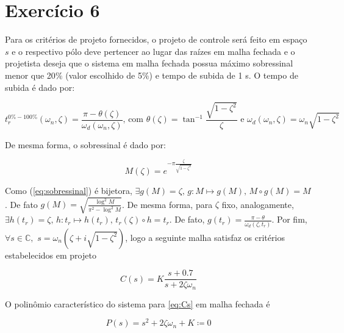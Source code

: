 \section*{Exercício 6}
\label{ex:6}

    Para os critérios de projeto fornecidos, o projeto de controle será feito em espaço $s$ e o respectivo pólo deve pertencer ao lugar das raízes em malha fechada e o projetista deseja que o sistema em malha fechada possua máximo sobressinal menor que 20$\%$ (valor escolhido de 5$\%$) e tempo de subida de 1 s. O tempo de subida é dado por:
    
        \begin{equation}
            t^{0\% - 100\%}_{r}(\omega_n, \zeta) = \frac{\pi - \theta(\zeta)}{\omega_d(\omega_n, \zeta)} \mbox{, com } \theta(\zeta) = \tan^{-1}\frac{\sqrt{1 - \zeta^2}}{\zeta} \mbox{ e } \omega_d(\omega_n, \zeta) = \omega_n \sqrt{1-\zeta^2}
            \label{eq:tempo_de_subida}
        \end{equation}
    
    De mesma forma, o sobressinal é dado por:
    
        \begin{equation}
            M(\zeta) = e^{-\pi \frac{\zeta}{\sqrt{1-\zeta^2}}}
            \label{eq:sobressinal}
        \end{equation}
    
    Como (\ref{eq:sobressinal}) é bijetora, $\exists g(M) = \zeta \mbox{, } g: M \longmapsto g(M) \mbox{, } M \circ g (M) = M$. De fato $g(M) = \sqrt{\frac{\log^2{M}}{\pi^2 - \log^2{M}}}$. De mesma forma, para $\zeta$ fixo, analogamente, $\exists h(t_r) = \zeta\mbox{, }h: t_r \longmapsto h(t_r)\mbox{, } t_r(\zeta) \circ h = t_r$. De fato, $g(t_r) = \frac{\pi - \theta}{\omega_d(\zeta, t_r)}$. Por fim, $\forall s \in \mathbb{C}, \,\, s = \omega_n (\zeta + i \sqrt{1 - \zeta^2})$, logo a seguinte malha satisfaz os critérios estabelecidos em projeto
    
        \begin{equation}
        C(s) = K \frac{s + 0.7}{s + 2 \zeta \omega_n}
        \label{eq:Cs}
        \end{equation}
    
    O polinômio característico do sistema para \eqref{eq:Cs} em malha fechada é 
    
        \begin{equation}
        P(s) = s^2 + 2\zeta \omega_n + K \coloneqq 0
        \label{eq:polcarac}
        \end{equation}
    
